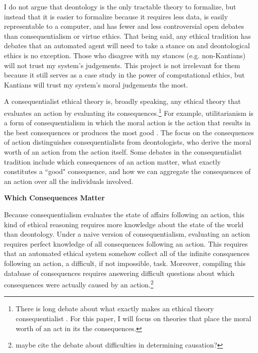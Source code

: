 \begin{isabellebody}
\begin{isamarkuptext}
I do not argue that deontology is the only tractable theory to formalize, but instead that it is 
easier to formalize because it requires less data, is easily representable to a computer, and has fewer
and less controversial open debates than consequentialism or virtue ethics. That being said, any ethical
tradition has debates that an automated agent will need to take a stance on and deontological ethics
is no exception. Those who disagree with my stances (e.g. non-Kantians) will not trust my system's
judgements. This project is not irrelevant for them because it still serves as a case study in 
the power of computational ethics, but Kantians will trust my system's moral judgements the most.%
\end{isamarkuptext}\isamarkuptrue%
%
\isadelimdocument
%
\endisadelimdocument
%
\isatagdocument
%
\isamarkuptrue%
%
\endisatagdocument
{\isafolddocument}%
%
\isadelimdocument
%
\endisadelimdocument
%
\begin{isamarkuptext}%
A consequentialist ethical theory is, broadly speaking, any ethical theory that evaluates an action by evaluating 
its consequences.\footnote{There is long debate about what exactly makes an ethical theory consequentialist \citep{consequentialismsep}. 
For this paper, I will focus on theories that place the moral worth of an act in its the consequences.} For example, 
utilitarianism is a form of consequentialism in which the moral action 
is the action that results in the best consequences or produces the most good \citep{utilsep}. The focus
on the consequences of action distinguishes consequentialists from deontologists, who derive the moral worth
of an action from the action itself. Some debates in the consequentialist tradition include 
which consequences of an action matter, what exactly constitutes a ``good" consequence, and how we can 
aggregate the consequences of an action over all the individuals involved.%
\end{isamarkuptext}\isamarkuptrue%
%
\begin{isamarkuptext}%
\textbf{Which Consequences Matter}%
\end{isamarkuptext}\isamarkuptrue%
%
\begin{isamarkuptext}%
Because consequentialism evaluates the state of affairs following an action, this kind of ethical 
reasoning requires more knowledge
about the state of the world than deontology. Under a naive version of consequentialism, evaluating 
an action requires perfect knowledge of all consequences following an action. This requires that an 
automated ethical system somehow collect all of the infinite consquences following an action, a 
difficult, if not impossible, task. Moreover, compiling this database of consequences requires 
answering difficult questions about which consequences were actually caused by an action.\footnote
{maybe cite the debate about difficulties in determining causation?}


\end{isamarkuptext}
\end{isabellebody}
